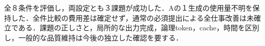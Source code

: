 全８条件を評価し，両設定とも３課題が成功した．Aの１生成の使用量不明を保持した．全件比較の費用差は確定せず，通常の必須提出による全仕事改善は未確立である．課題の正しさと，局所的な出力完成，論理token，cache，時間を区別し，一般的な品質維持は今後の独立した確認を要する．
